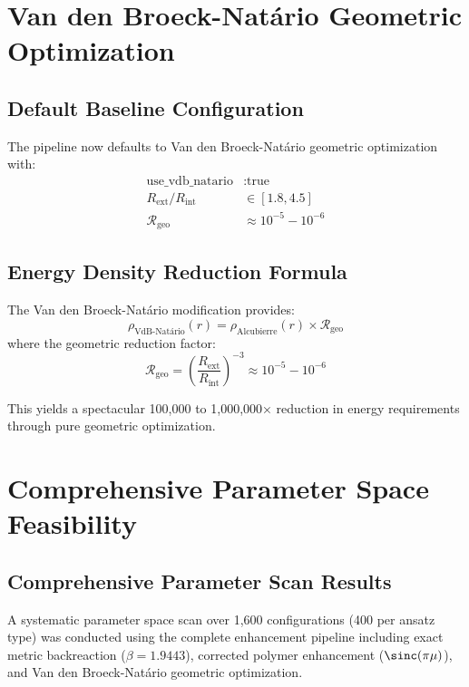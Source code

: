\documentclass[11pt,a4paper]{article}
\begin{document}
\section{Van den Broeck-Natário Geometric Optimization}

\subsection{Default Baseline Configuration}

The pipeline now defaults to Van den Broeck-Natário geometric optimization with:
\begin{align}
\text{use\_vdb\_natario} &: \text{true} \\
R_{\text{ext}}/R_{\text{int}} &\in [1.8, 4.5] \\
\mathcal{R}_{\text{geo}} &\approx 10^{-5} - 10^{-6}
\end{align}

\subsection{Energy Density Reduction Formula}

The Van den Broeck-Natário modification provides:
\begin{equation}
\boxed{\rho_{\text{VdB-Natário}}(r) = \rho_{\text{Alcubierre}}(r) \times \mathcal{R}_{\text{geo}}}
\end{equation}
where the geometric reduction factor:
\begin{equation}
\mathcal{R}_{\text{geo}} = \left(\frac{R_{\text{ext}}}{R_{\text{int}}}\right)^{-3} \approx 10^{-5} - 10^{-6}
\end{equation}

This yields a spectacular 100,000 to 1,000,000× reduction in energy requirements through pure geometric optimization.

\section{Comprehensive Parameter Space Feasibility}
\label{sec:parameter_space}

\subsection{Comprehensive Parameter Scan Results}

A systematic parameter space scan over 1,600 configurations (400 per ansatz type) was conducted using the complete enhancement pipeline including exact metric backreaction ($\beta = 1.9443$), corrected polymer enhancement ($\sinc(\pi\mu)$), and Van den Broeck-Natário geometric optimization.
\end{document}
